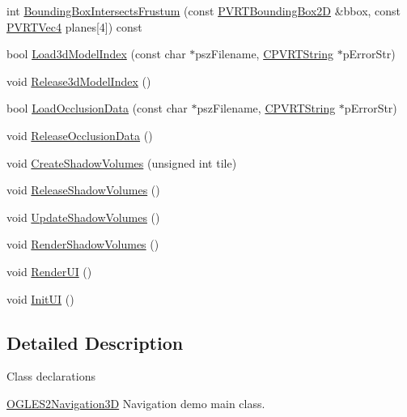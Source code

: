 \begin{DoxyCompactItemize}
\item 
int \hyperlink{class_o_g_l_e_s2_navigation3_d_aa9e4365152f3079f1116d171b19a5642}{Bounding\+Box\+Intersects\+Frustum} (const \hyperlink{struct_p_v_r_t_bounding_box2_d}{P\+V\+R\+T\+Bounding\+Box2\+D} \&bbox, const \hyperlink{struct_p_v_r_t_vec4}{P\+V\+R\+T\+Vec4} planes\mbox{[}4\mbox{]}) const 
\item 
bool \hyperlink{class_o_g_l_e_s2_navigation3_d_abf5968e31fefea19cbd49a8f2b029048}{Load3d\+Model\+Index} (const char $\ast$psz\+Filename, \hyperlink{class_c_p_v_r_t_string}{C\+P\+V\+R\+T\+String} $\ast$p\+Error\+Str)
\item 
void \hyperlink{class_o_g_l_e_s2_navigation3_d_a8549bc0b82ebebb92558861339b4493e}{Release3d\+Model\+Index} ()
\item 
bool \hyperlink{class_o_g_l_e_s2_navigation3_d_a061c1a0bf803aabc0e8720dae1fc723e}{Load\+Occlusion\+Data} (const char $\ast$psz\+Filename, \hyperlink{class_c_p_v_r_t_string}{C\+P\+V\+R\+T\+String} $\ast$p\+Error\+Str)
\item 
void \hyperlink{class_o_g_l_e_s2_navigation3_d_a0ec1a34f8b93330da8649d036ca6c185}{Release\+Occlusion\+Data} ()
\item 
void \hyperlink{class_o_g_l_e_s2_navigation3_d_a21af406806e1d242d07719def43bdd23}{Create\+Shadow\+Volumes} (unsigned int tile)
\item 
void \hyperlink{class_o_g_l_e_s2_navigation3_d_abdfb871935f9e0698e6dc43a40807170}{Release\+Shadow\+Volumes} ()
\item 
void \hyperlink{class_o_g_l_e_s2_navigation3_d_a0149c8b5b297305aaa8ee8161d9a4426}{Update\+Shadow\+Volumes} ()
\item 
void \hyperlink{class_o_g_l_e_s2_navigation3_d_acdf2912b3ecb62c1ce4532cfdac9c44a}{Render\+Shadow\+Volumes} ()
\item 
void \hyperlink{class_o_g_l_e_s2_navigation3_d_ad56b99ca84bf7ae77c9bd7a3645bd142}{Render\+U\+I} ()
\item 
void \hyperlink{class_o_g_l_e_s2_navigation3_d_ab17d4fa3e9d1a36bb52436d3370d555a}{Init\+U\+I} ()
\end{DoxyCompactItemize}


\subsection{Detailed Description}


 Class declarations



  \hyperlink{class_o_g_l_e_s2_navigation3_d}{O\+G\+L\+E\+S2\+Navigation3\+D}  Navigation demo main class. 

